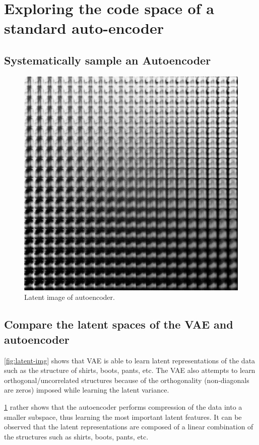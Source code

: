 \documentclass[twocolumn]{article}
\begin{document}
\section{Exploring the code space of a standard auto-encoder}

\subsection{Systematically sample an Autoencoder}

\begin{figure}
    \includegraphics[width=\linewidth]{Figures/latent_img_2.pdf}
    \caption{Latent image of autoencoder.}
    \label{fig:latent-img-2}
\end{figure}

\subsection{Compare the latent spaces of the VAE and autoencoder}

\cref{fig:latent-img} shows that VAE is able to learn latent representations of the data such as the structure of shirts, boots, pants, etc. The VAE also attempts to learn orthogonal/uncorrelated structures because of the orthogonality (non-diagonals are zeros) imposed while learning the latent variance.

\cref{fig:latent-img-2} rather shows that the autoencoder performs compression of the data into a smaller subspace, thus learning the most important latent features. It can be observed that the latent representations are composed of a linear combination of the structures such as shirts, boots, pants, etc.
\end{document}
